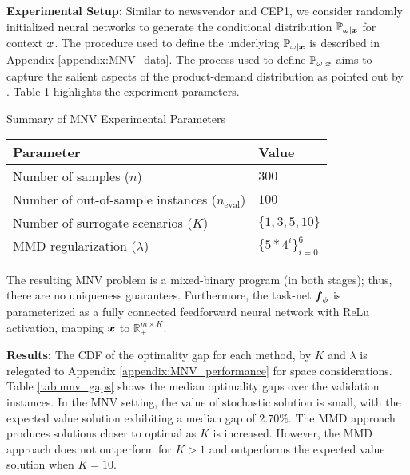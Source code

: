 \vspace{\littlespace}
\noindent \textbf{Experimental Setup:}  Similar to newsvendor and CEP1, we consider randomly initialized neural networks to generate the conditional distribution $\mathbb{P}_{\omega | \boldsymbol{x}}$ for context $\boldsymbol{x}$. The procedure used to define the underlying $\mathbb{P}_{\omega | \boldsymbol{x}}$ is described in Appendix \ref{appendix:MNV_data}. The process used to define $\mathbb{P}_{\omega | \boldsymbol{x}}$ aims to capture the salient aspects of the product-demand distribution as pointed out by \citet{vaagen2011modelling}. Table \ref{tab:MNV_parameters} highlights the experiment parameters. 
\begin{table}[h]
    \TABLE
    {Summary of MNV Experimental Parameters  \label{tab:MNV_parameters}}
    {
    \begin{tabular}{ll}
    \toprule
    \textbf{Parameter} & \textbf{Value} \\
    \midrule
    Number of samples ($n$) & $300$\\
    Number of out-of-sample instances ($n_{\text{eval}}$) & $100$ \\
    Number of surrogate scenarios ($K$) & $\{1, 3, 5, 10\}$ \\
    MMD regularization ($\lambda$) & $\{5*4^{i}\}_{i=0}^6$ \\
    \bottomrule
    \end{tabular}}{}
\end{table}

The resulting MNV problem is a mixed-binary program (in both stages); thus, there are no uniqueness guarantees. Furthermore, the task-net $\boldsymbol{f}_{\phi}$ is parameterized as a fully connected feedforward neural network with ReLu activation, mapping $\boldsymbol{x}$ to $\mathbb{R}_{+}^{m \times K}$.

\vspace{\littlespace}
\noindent \textbf{Results:} The CDF of the optimality gap for each method, by $K$ and $\lambda$ is relegated to Appendix \ref{appendix:MNV_performance} for space considerations. Table \ref{tab:mnv_gaps} shows the median optimality gaps over the validation instances. In the MNV setting, the value of stochastic solution is small, with the expected value solution exhibiting a median gap of $2.70\%$. The MMD approach produces solutions closer to optimal as $K$ is increased. However, the MMD approach does not outperform for $K > 1$ and outperforms the expected value solution when $K = 10$.

